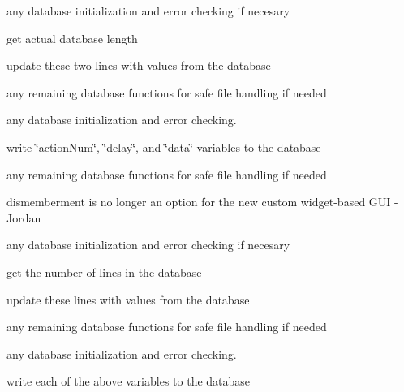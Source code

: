
\begin{DoxyRefList}
\item[\label{todo__todo000002}%
\hypertarget{todo__todo000002}{}%
Member \hyperlink{class_flight_path_a9be65ab000a34bf60862b8b1af77d43d}{Flight\+Path\+:\+:Flight\+Path} (Q\+String filename)]any database initialization and error checking if necesary 

get actual database length 

update these two lines with values from the database 

any remaining database functions for safe file handling if needed  
\item[\label{todo__todo000006}%
\hypertarget{todo__todo000006}{}%
Member \hyperlink{class_flight_path_a3a602f9b4b608f506354bf6c711a84eb}{Flight\+Path\+:\+:save} (Q\+String filename)]any database initialization and error checking. 

write \char`\"{}action\+Num\char`\"{}, \char`\"{}delay\char`\"{}, and \char`\"{}data\char`\"{} variables to the database 

any remaining database functions for safe file handling if needed  
\item[\label{todo__todo000010}%
\hypertarget{todo__todo000010}{}%
Member \hyperlink{class_main_m_d_i_display_a782ef2721fdd8b24924ce87dc66bb55c}{Main\+M\+D\+I\+Display\+:\+:Main\+M\+D\+I\+Display} (Q\+Widget $\ast$parent=0)]\textquotesingle{}dismemberment\textquotesingle{} is no longer an option for the new custom widget-\/based G\+U\+I -\/\+Jordan  
\item[\label{todo__todo000011}%
\hypertarget{todo__todo000011}{}%
Member \hyperlink{class_mission_a3c1cb92197018f64854514616b43f06b}{Mission\+:\+:Mission} (Q\+String filename)]any database initialization and error checking if necesary 

get the number of lines in the database 

update these lines with values from the database 

any remaining database functions for safe file handling if needed  
\item[\label{todo__todo000015}%
\hypertarget{todo__todo000015}{}%
Member \hyperlink{class_mission_a8e02183538b8e0095f7a6e609149f75d}{Mission\+:\+:save} (Q\+String filename)]any database initialization and error checking. 

write each of the above variables to the database 


\end{DoxyRefList}
